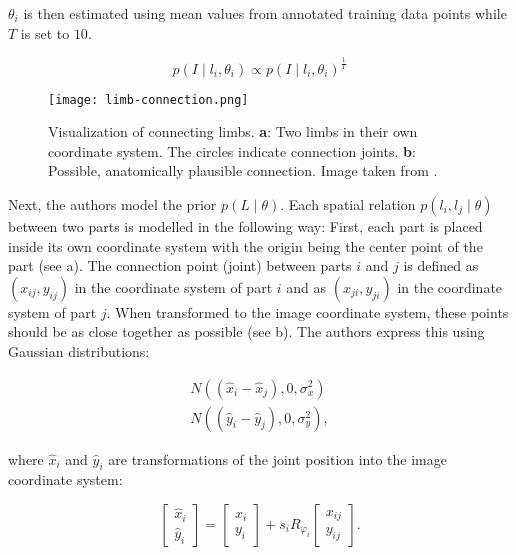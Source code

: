 $\theta_i$ is then estimated using mean values from annotated training data points while $T$ is set to $10$.

\begin{equation}
    \label{eq:smoothed}
    p(I \mid l_i, \theta_i) \propto p(I \mid l_i, \theta_i)^{\frac{1}{T}}
\end{equation}

\begin{figure}[htb!]
    \centering
    \texttt{[image: limb-connection.png]}
    \caption{Visualization of connecting limbs. \textbf{a}: Two limbs in their own coordinate system. The circles indicate connection joints. \textbf{b}: Possible, anatomically plausible connection. Image taken from \cite{felzenszwalb_pictorial_2005}.}
    \label{fig:limb-connection}
\end{figure}

Next, the authors model the prior $p(L \mid \theta)$.
Each spatial relation $p(l_i, l_j \mid \theta)$ between two parts is modelled in the following way:
First, each part is placed inside its own coordinate system with the origin being the center point of the part (see a).
The connection point (joint) between parts $i$ and $j$ is defined as $(x_{ij}, y_{ij})$ in the coordinate system of part $i$ and as $(x_{ji}, y_{ji})$ in the coordinate system of part $j$.
When transformed to the image coordinate system, these points should be as close together as possible (see b).
The authors express this using Gaussian distributions:

\begin{equation}
    \begin{split}
        N((\hat{x}_i - \hat{x}_j), 0, \sigma^2_x) \\
        N((\hat{y}_i - \hat{y}_j), 0, \sigma^2_y),       
    \end{split}
\end{equation}

where $\hat{x}_i$ and $\hat{y}_i$ are transformations of the joint position into the image coordinate system:

\begin{equation}
    \begin{bmatrix}
        \hat{x}_i \\ 
        \hat{y}_i
    \end{bmatrix}
    =
    \begin{bmatrix}
        x_i \\ 
        y_i
    \end{bmatrix}
    + s_i R_{\varphi_i}
    \begin{bmatrix}
        x_{ij} \\ 
        y_{ij}
    \end{bmatrix}.
\end{equation}

